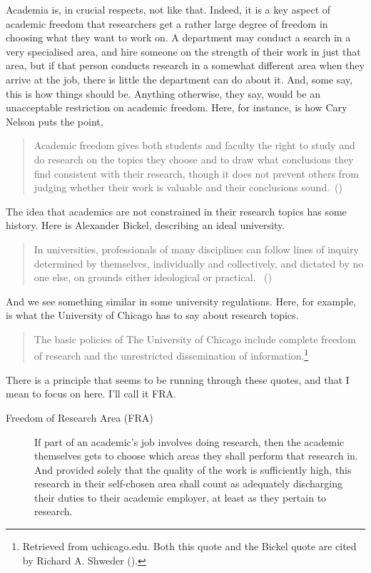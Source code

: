 \documentclass[
  11pt,
  letterpaper,
  DIV=11,
  numbers=noendperiod,
  twoside]{scrartcl}
\begin{document}
Academia is, in crucial respects, not like that. Indeed, it is a key
aspect of academic freedom that researchers get a rather large degree of
freedom in choosing what they want to work on. A department may conduct
a search in a very specialised area, and hire someone on the strength of
their work in just that area, but if that person conducts research in a
somewhat different area when they arrive at the job, there is little the
department can do about it. And, some say, this is how things should be.
Anything otherwise, they say, would be an unacceptable restriction on
academic freedom. Here, for instance, is how Cary Nelson puts the point,

\begin{quote}
Academic freedom gives both students and faculty the right to study and
do research on the topics they choose and to draw what conclusions they
find consistent with their research, though it does not prevent others
from judging whether their work is valuable and their conclusions
sound.~()
\end{quote}

The idea that academics are not constrained in their research topics has
some history. Here is Alexander Bickel, describing an ideal university.

\begin{quote}
In universities, professionals of many disciplines can follow lines of
inquiry determined by themselves, individually and collectively, and
dictated by no one else, on grounds either ideological or practical.
~()
\end{quote}

And we see something similar in some university regulations. Here, for
example, is what the University of Chicago has to say about research
topics.

\begin{quote}
The basic policies of The University of Chicago include complete freedom
of research and the unrestricted dissemination of
information.\footnote{Retrieved from uchicago.edu. Both this quote and
  the Bickel quote are cited by Richard A. Shweder
  ().}
\end{quote}

There is a principle that seems to be running through these quotes, and
that I mean to focus on here. I'll call it FRA.

\begin{description}
\item[Freedom of Research Area (FRA)]
If part of an academic's job involves doing research, then the academic
themselves gets to choose which areas they shall perform that research
in. And provided solely that the quality of the work is sufficiently
high, this research in their self-chosen area shall count as adequately
discharging their duties to their academic employer, at least as they
pertain to research.
\end{description}
\end{document}
